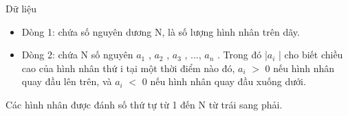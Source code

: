 Dữ liệu
\begin{itemize}
	\item     Dòng 1: chứa số nguyên dương N, là số lượng hình nhân trên dãy.   
	\item     Dòng 2: chứa N số nguyên $a_{1}$    , $a_{2}$    , $a_{3}$    , ..., $a_{n}$    . Trong đó |$a_{i}$    | cho biết chiều cao của hình nhân thứ i tại một thời điểm nào đó, $a_{i}$    $>$ 0 nếu hình nhân quay đầu lên trên, và $a_{i}$    $<$ 0 nếu hình nhân quay đầu xuống dưới.   
\end{itemize}

   Các hình nhân được đánh số thứ tự từ 1 đến N từ trái sang phải.